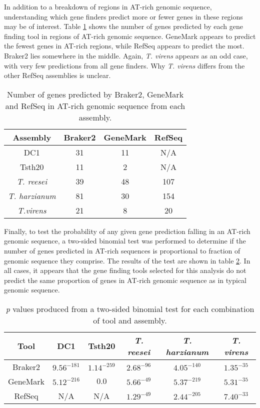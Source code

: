 In addition to a breakdown of regions in AT-rich genomic sequence,
understanding which gene finders predict more or fewer genes in these
regions may be of interest. Table \ref{table:gc-gene-counts} shows the
number of genes predicted by each gene finding tool in regions of
AT-rich genomic sequence. GeneMark appears to predict the fewest genes
in AT-rich regions, while RefSeq appears to predict the most. Braker2
lies somewhere in the middle. Again, \textit{T. virens} appears as an
odd case, with very few predictions from all gene finders. Why
\textit{T. virens} differs from the other RefSeq assemblies is
unclear.

\begin{table}
  \begin{center}
    \begin{tabular}{|c|c|c|c|}
      \hline
      Assembly & Braker2 & GeneMark & RefSeq \\ \hline
      DC1 & 31 & 11 & N/A \\ \hline
      Tsth20 & 11 & 2 & N/A \\ \hline
      \textit{T. reesei} & 39 & 48 & 107 \\ \hline
      \textit{T. harzianum} & 81 & 30 & 154 \\ \hline
      \textit{T.virens} & 21 & 8 & 20 \\ \hline
    \end{tabular}
  \end{center}
  \caption{Number of genes predicted by Braker2, GeneMark and RefSeq
    in AT-rich genomic sequence from each assembly.}
  \label{table:gc-gene-counts}
\end{table}

Finally, to test the probability of any given gene prediction falling
in an AT-rich genomic sequence, a two-sided binomial test was
performed to determine if the number of genes predicted in AT-rich
sequences is proportional to fraction of genomic sequence they
comprise. The results of the test are shown in table
\ref{table:gc-binomial}. In all cases, it appears that the gene
finding tools selected for this analysis do not predict the same
proportion of genes in AT-rich genomic sequence as in typical genomic
sequence.

\begin{table}
  \begin{center}
    \begin{tabular}{|c|c|c|c|c|c|}
      \hline
      Tool & DC1 & Tsth20 & \textit{T. reesei} & \textit{T. harzianum} & \textit{T. virens} \\ \hline
      Braker2 & $9.56^{-181}$ & $1.14^{-259}$ & $2.68^{-96}$ & $4.05^{-140}$ & $1.35^{-35}$ \\ \hline
      GeneMark & $5.12^{-216}$ & $0.0$ & $5.66^{-49}$ & $5.37^{-219}$ & $5.31^{-35}$ \\ \hline
      RefSeq & N/A & N/A & $1.29^{-49}$ & $2.44^{-205}$ & $7.40^{-33}$ \\ \hline
    \end{tabular}
  \end{center}
  \caption{\textit{p} values produced from a two-sided binomial test
    for each combination of tool and assembly.}
  \label{table:gc-binomial}
\end{table}

